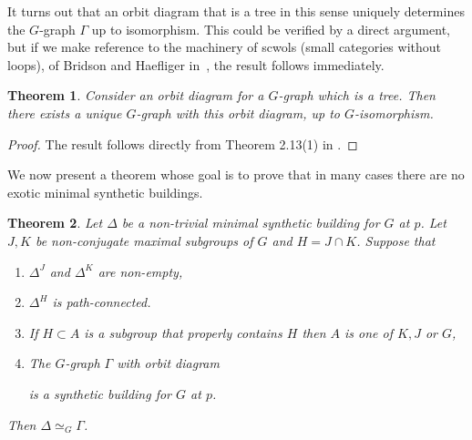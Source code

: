 \documentclass[12pt]{amsart}
\theoremstyle{plain}
\newtheorem{theorem}{Theorem}[section]
\theoremstyle{definition}
\theoremstyle{remark}
\numberwithin{equation}{section}
\begin{document}
It turns out that an orbit diagram that is a tree in this sense uniquely determines the $G$-graph $\Gamma$ up to isomorphism. This could be verified by a direct argument, but if we make reference to the machinery of scwols (small categories without loops), of Bridson and Haefliger in~\cite{Bri1999}, the result follows immediately.
\begin{theorem}\label{thm:uniqueGgraphs}
    Consider an orbit diagram for a $G$-graph which is a tree. Then there exists a unique $G$-graph with this orbit diagram, up to $G$-isomorphism.
\end{theorem}
\begin{proof}
    The result follows directly from Theorem 2.13(1) in \cite{Bri1999}.
\end{proof}



We now present a theorem whose goal is to prove that in many cases there are no exotic minimal synthetic buildings.

\begin{theorem}
\label{uniqueness-theorem}
    Let $\Delta$ be a non-trivial minimal synthetic building for $G$ at $p$. Let $J,K$ be non-conjugate maximal subgroups of $G$ and $H=J\cap K$. Suppose that
    \begin{enumerate}
        \item $\Delta^J$ and $\Delta^K$ are non-empty,
        \item $\Delta^H$ is path-connected.
        \item If $H\subset A$ is a subgroup that properly contains $H$ then $A$ is one of $K,J$ or $G$,
        \item The $G$-graph $\Gamma$ with orbit diagram 
        \scalebox{0.75}
            {}
is a synthetic building for $G$ at $p$.
    \end{enumerate}
Then $\Delta\simeq_G \Gamma$.
\end{theorem}
\end{document}
